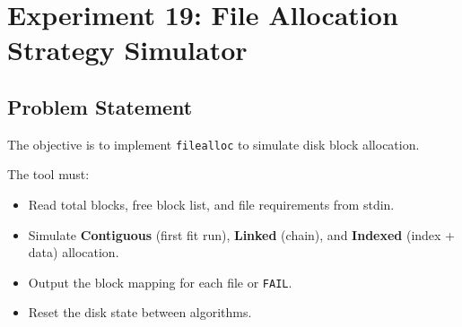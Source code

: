 
\section{Experiment 19: File Allocation Strategy Simulator}

\subsection{Problem Statement}
The objective is to implement \texttt{filealloc} to simulate disk block allocation.

The tool must:
\begin{itemize}
    \item Read total blocks, free block list, and file requirements from stdin.
    \item Simulate \textbf{Contiguous} (first fit run), \textbf{Linked} (chain), and \textbf{Indexed} (index + data) allocation.
    \item Output the block mapping for each file or \verb|FAIL|.
    \item Reset the disk state between algorithms.
\end{itemize}

